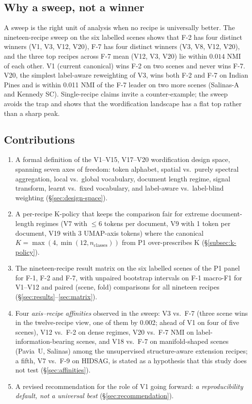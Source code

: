 \documentclass[journal,a4paper,10pt]{IEEEtran}
\begin{document}
\subsection{Why a sweep, not a winner}
\label{subsec:why-sweep}
A sweep is the right unit of analysis when no recipe is universally
better. The nineteen-recipe sweep on the six labelled scenes
shows that F-2 has four distinct winners (V1, V3, V12, V20), F-7 has
four distinct winners (V3, V8, V12, V20), and the three top recipes
across F-7 mean (V12, V3, V20) lie within $0.014$ NMI of each other.
V1 (current canonical) wins F-2 on two scenes and never wins F-7.
V20, the simplest label-aware reweighting of V3, wins both F-2
and F-7 on Indian Pines and is within 0.011 NMI of the F-7 leader on
two more scenes (Salinas-A and Kennedy SC).
Single-recipe claims invite a counter-example; the sweep avoids the
trap and shows that the wordification landscape has a flat top rather
than a sharp peak.

\subsection{Contributions}
\label{subsec:contributions}
\begin{enumerate}
  \item A formal definition of the V1--V15, V17--V20 wordification
    design space, spanning seven axes of freedom: token alphabet,
    spatial vs.\ purely spectral aggregation, local vs.\ global
    vocabulary, document length regime, signal transform, learnt vs.\
    fixed vocabulary, and label-aware vs.\ label-blind weighting
    (\S\ref{sec:design-space}).
  \item A per-recipe K-policy that keeps the comparison fair for
    extreme document-length regimes (V7 with $\le 6$ tokens per
    document, V9 with 1 token per document, V19 with 3 UMAP-axis
    tokens) where the canonical
    $K = \max(4, \min(12, n_{\text{classes}}))$ from P1 over-prescribes
    K (\S\ref{subsec:k-policy}).
  \item The nineteen-recipe result matrix on the six labelled scenes
    of the P1 panel for F-1, F-2 and F-7, with unpaired bootstrap
    intervals on F-1 macro-F1 for V1--V12 and paired (scene, fold)
    comparisons for all nineteen recipes
    (\S\ref{sec:results}--\ref{sec:matrix}).
  \item Four \emph{axis--recipe affinities} observed in the sweep:
    V3 vs.\ F-7 (three scene wins in the twelve-recipe view, one of them
    by 0.002; ahead of V1 on four of five scenes), V12 vs.\ F-2 on dense regimes, V20 vs.\ F-7
    NMI on label-information-bearing scenes, and V18 vs.\ F-7 on
    manifold-shaped scenes (Pavia~U, Salinas) among the unsupervised
    structure-aware extension recipes; a fifth, V7 vs.\ F-9 on HIDSAG, is stated
    as a hypothesis that this study does not test
    (\S\ref{sec:affinities}).
  \item A revised recommendation for the role of V1 going forward:
    \emph{a reproducibility default, not a universal best}
    (\S\ref{sec:recommendation}).
\end{enumerate}
\end{document}
